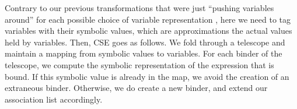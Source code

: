 \documentclass{llncs}
\begin{document}
Contrary to our previous transformations that were just ``pushing
variables around'' for each possible choice of variable representation
, here we need to tag variables with their symbolic values,
which are approximations the actual values held by variables.
% 
%
Then, CSE goes as follows. We fold through a telescope and maintain a
mapping from symbolic values to variables. For each binder of the
telescope, we compute the symbolic representation of the expression
that is bound. 
%
If this symbolic value is already in the map, we avoid the creation of
an extraneous binder. Otherwise, we do create a new binder, and extend
our association list accordingly. 
 

\end{document}
